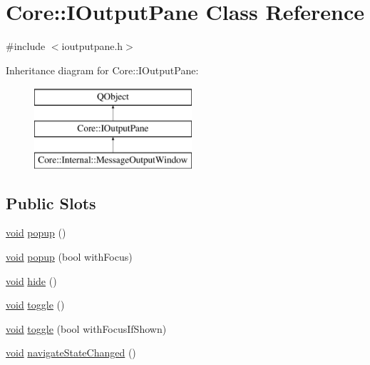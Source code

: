 \hypertarget{class_core_1_1_i_output_pane}{\section{Core\-:\-:I\-Output\-Pane Class Reference}
\label{class_core_1_1_i_output_pane}
}


{\ttfamily \#include $<$ioutputpane.\-h$>$}

Inheritance diagram for Core\-:\-:I\-Output\-Pane\-:\begin{figure}[H]
\begin{center}
\leavevmode
\includegraphics[height=3.000000cm]{class_core_1_1_i_output_pane}
\end{center}
\end{figure}
\subsection*{Public Slots}
\begin{DoxyCompactItemize}
\item 
\hyperlink{group___u_a_v_objects_plugin_ga444cf2ff3f0ecbe028adce838d373f5c}{void} \hyperlink{group___core_plugin_ga96646cdb720d2f1a819147ffc22748cb}{popup} ()
\item 
\hyperlink{group___u_a_v_objects_plugin_ga444cf2ff3f0ecbe028adce838d373f5c}{void} \hyperlink{group___core_plugin_ga37eda05403e637a641e31a221f4f16fd}{popup} (bool with\-Focus)
\item 
\hyperlink{group___u_a_v_objects_plugin_ga444cf2ff3f0ecbe028adce838d373f5c}{void} \hyperlink{group___core_plugin_gace5067407c84261c848e18533416a9c7}{hide} ()
\item 
\hyperlink{group___u_a_v_objects_plugin_ga444cf2ff3f0ecbe028adce838d373f5c}{void} \hyperlink{group___core_plugin_ga5b1cac6c84e8ad71438a8b1d42a3295c}{toggle} ()
\item 
\hyperlink{group___u_a_v_objects_plugin_ga444cf2ff3f0ecbe028adce838d373f5c}{void} \hyperlink{group___core_plugin_ga64a1d14b461a93a287ed24c9a058674b}{toggle} (bool with\-Focus\-If\-Shown)
\item 
\hyperlink{group___u_a_v_objects_plugin_ga444cf2ff3f0ecbe028adce838d373f5c}{void} \hyperlink{group___core_plugin_ga1d93873edcf628da2a1db4365f8be494}{navigate\-State\-Changed} ()
\end{DoxyCompactItemize}
